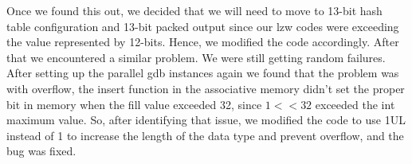 \documentclass[../main.tex]{subfiles}
\begin{document}
\begin{enumerate}
\begin{itemize}
    Once we found this out, we decided that we will need to move to 13-bit hash table configuration and 13-bit packed output since our lzw codes were exceeding the value represented by 12-bits. Hence, we modified the code accordingly. After that we encountered a similar problem. We were still getting random failures. After setting up the parallel gdb instances again we found that the problem was with overflow, the insert function in the associative memory didn’t set the proper bit in memory when the fill value exceeded 32, since $1 << 32$ exceeded the int maximum value. So, after identifying that issue, we modified the code to use 1UL instead of 1 to increase the length of the data type and prevent overflow, and the bug was fixed. 
\end{itemize}


\end{enumerate}
\end{document}
